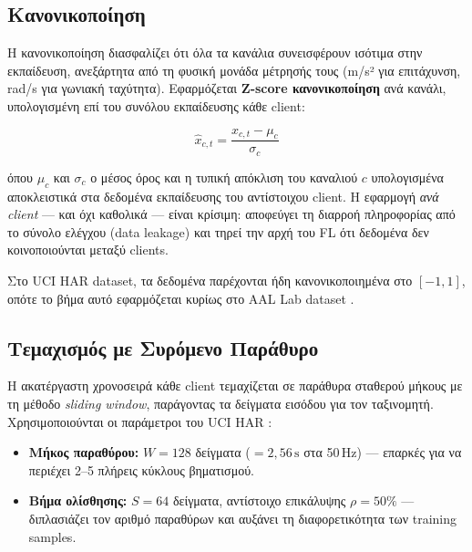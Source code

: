 \subsection{Κανονικοποίηση}
\label{subsec:normalization}

Η κανονικοποίηση διασφαλίζει ότι όλα τα κανάλια συνεισφέρουν
ισότιμα στην εκπαίδευση, ανεξάρτητα από τη φυσική μονάδα μέτρησής
τους (m/s² για επιτάχυνση, rad/s για γωνιακή ταχύτητα). Εφαρμόζεται
\textbf{Z-score κανονικοποίηση} ανά κανάλι, υπολογισμένη επί του
συνόλου εκπαίδευσης κάθε client:

\begin{equation}
    \label{eq:zscore}
    \hat{x}_{c,t} = \frac{x_{c,t} - \mu_c}{\sigma_c}
\end{equation}

\noindent όπου $\mu_c$ και $\sigma_c$ ο μέσος όρος και η τυπική
απόκλιση του καναλιού $c$ υπολογισμένα αποκλειστικά στα δεδομένα
εκπαίδευσης του αντίστοιχου client. Η εφαρμογή \textit{ανά client}
— και όχι καθολικά — είναι κρίσιμη: αποφεύγει τη διαρροή
πληροφορίας από το σύνολο ελέγχου (data leakage) και τηρεί την
αρχή του FL ότι δεδομένα δεν κοινοποιούνται μεταξύ clients.

Στο UCI HAR dataset, τα δεδομένα παρέχονται ήδη κανονικοποιημένα
στο $[-1, 1]$, οπότε το βήμα αυτό εφαρμόζεται κυρίως στο AAL
Lab dataset \cite{AAL_UCI2016}.

\subsection{Τεμαχισμός με Συρόμενο Παράθυρο}
\label{subsec:sliding_window}

Η ακατέργαστη χρονοσειρά κάθε client τεμαχίζεται σε παράθυρα
σταθερού μήκους με τη μέθοδο \textit{sliding window}, παράγοντας
τα δείγματα εισόδου για τον ταξινομητή. Χρησιμοποιούνται οι
παράμετροι του UCI HAR \cite{Anguita2013}:

\begin{itemize}
    \item \textbf{Μήκος παραθύρου:} $W = 128$ δείγματα
    ($= 2{,}56\,\text{s}$ στα 50\,Hz) — επαρκές για να περιέχει
    2–5 πλήρεις κύκλους βηματισμού.

    \item \textbf{Βήμα ολίσθησης:} $S = 64$ δείγματα, αντίστοιχο
    επικάλυψης $\rho = 50\%$ — διπλασιάζει τον αριθμό παραθύρων
    και αυξάνει τη διαφορετικότητα των training samples.
\end{itemize}

